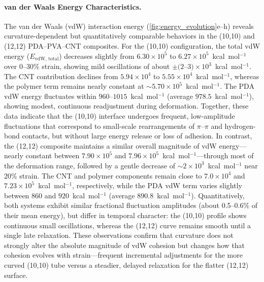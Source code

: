 \documentclass[journal=jacsat,manuscript=article]{achemso}
\begin{document}
{\paragraph{van der Waals Energy Characteristics.}
The van der Waals (vdW) interaction energy (\autoref{fig:energy_evolution}e–h) reveals curvature-dependent but quantitatively comparable behaviors in the (10,10) and (12,12) PDA–PVA–CNT composites. For the (10,10) configuration, the total vdW energy ($E_\mathrm{vdW,\,total}$) decreases slightly from $6.30\times10^{5}$ to $6.27\times10^{5}$~kcal~mol$^{-1}$ over 0–30\% strain, showing mild oscillations of about $\pm(2$–$3)\!\times\!10^{3}$~kcal~mol$^{-1}$. The CNT contribution declines from $5.94\times10^{4}$ to $5.55\times10^{4}$~kcal~mol$^{-1}$, whereas the polymer term remains nearly constant at $\sim5.70\times10^{5}$~kcal~mol$^{-1}$. The PDA vdW energy fluctuates within $960$–$1015$~kcal~mol$^{-1}$ (average $978.5$~kcal~mol$^{-1}$), showing modest, continuous readjustment during deformation. Together, these data indicate that the (10,10) interface undergoes frequent, low-amplitude fluctuations that correspond to small-scale rearrangements of $\pi$–$\pi$ and hydrogen-bond contacts, but without large energy release or loss of adhesion. In contrast, the (12,12) composite maintains a similar overall magnitude of vdW energy—nearly constant between $7.90\times10^{5}$ and $7.96\times10^{5}$~kcal~mol$^{-1}$—through most of the deformation range, followed by a gentle decrease of $\sim2\times10^{3}$~kcal~mol$^{-1}$ near 20\% strain. The CNT and polymer components remain close to $7.0\times10^{4}$ and $7.23\times10^{5}$~kcal~mol$^{-1}$, respectively, while the PDA vdW term varies slightly between $860$ and $920$~kcal~mol$^{-1}$ (average $890.8$~kcal~mol$^{-1}$). Quantitatively, both systems exhibit similar fractional fluctuation amplitudes (about 0.5–0.6\% of their mean energy), but differ in temporal character: the (10,10) profile shows continuous small oscillations, whereas the (12,12) curve remains smooth until a single late relaxation. These observations confirm that curvature does not strongly alter the absolute magnitude of vdW cohesion but changes how that cohesion evolves with strain—frequent incremental adjustments for the more curved (10,10) tube versus a steadier, delayed relaxation for the flatter (12,12) surface.




}
\end{document}
